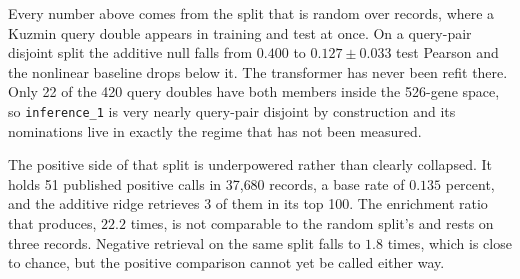 Every number above comes from the split that is random over records, where a
Kuzmin query double appears in training and test at once. On a query-pair
disjoint split the additive null falls from $0.400$ to $0.127 \pm 0.033$ test
Pearson and the nonlinear baseline drops below it. The transformer has never been
refit there. Only 22 of the 420 query doubles have both members inside the
526-gene space, so \texttt{inference\_1} is very nearly query-pair disjoint by
construction and its nominations live in exactly the regime that has not been
measured.

The positive side of that split is underpowered rather than clearly collapsed.
It holds 51 published positive calls in 37{,}680 records, a base rate of $0.135$
percent, and the additive ridge retrieves 3 of them in its top 100. The
enrichment ratio that produces, $22.2$ times, is not comparable to the random
split's and rests on three records. Negative retrieval on the same split falls to
$1.8$ times, which is close to chance, but the positive comparison cannot yet be
called either way.
